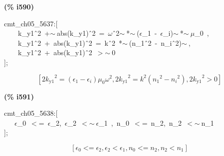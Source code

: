 \documentclass[fleqn]{article}
\begin{document}
\noindent
\begin{minipage}[t]{4.000000em}\color{red}\bfseries
(\% i590)	
\end{minipage}
\begin{minipage}[t]{\textwidth}\color{blue}
cmt\_ch05\_5637:[\\
\ \ \ \ k\_y1\^\ 2\ +\ensuremath{\sim\ }abs(k\_y1)\^\ 2\ =\ \ensuremath{\omega}\^\ 2\ensuremath{\sim\ }*\ensuremath{\sim\ }(\ensuremath{\epsilon}\_1\ -\ \ensuremath{\epsilon}\_i)\ensuremath{\sim\ }*\ensuremath{\sim\ }\ensuremath{\mu}\_0\ ,\ \\
\ \ \ \ k\_y1\^\ 2\ +\ abs(k\_y1)\^\ 2\ =\ k\^\ 2\ *\ensuremath{\sim\ }(n\_1\^\ 2\ -\ n\_i\^\ 2)\ensuremath{\sim\ },\\
\ \ \ \ k\_y1\^\ 2\ +\ abs(k\_y1)\^\ 2\ \ensuremath{>}\ensuremath{\sim\ }0\\
];
\end{minipage}
\[\displaystyle \tag{\% o590} 
\left[ 2 {{{k_{\ensuremath{\mathrm{y1}}}}}^{2}}=\left( {{\epsilon }_1}-{{\epsilon }_i}\right)  {{\mu }_0} {{\omega }^{2}}\operatorname{,}2 {{{k_{\ensuremath{\mathrm{y1}}}}}^{2}}={{k}^{2}} \left( {{{n_1}}^{2}}-{{{n_i}}^{2}}\right) \operatorname{,}2 {{{k_{\ensuremath{\mathrm{y1}}}}}^{2}}\operatorname{>  }0\right] \mbox{}
\]


\noindent
\begin{minipage}[t]{4.000000em}\color{red}\bfseries
(\% i591)	
\end{minipage}
\begin{minipage}[t]{\textwidth}\color{blue}
cmt\_ch05\_5638:[\\
\ \ \ \ensuremath{\epsilon}\_0\ \ensuremath{<}=\ \ensuremath{\epsilon}\_2,\ \ensuremath{\epsilon}\_2\ \ensuremath{<}\ensuremath{\sim\ }\ensuremath{\epsilon}\_1\ ,\ n\_0\ \ensuremath{<}=\ n\_2,\ n\_2\ \ensuremath{<}\ensuremath{\sim\ }n\_1\\
];
\end{minipage}
\[\displaystyle \tag{\% o591} 
\left[ {{\epsilon }_0}\operatorname{<  =}{{\epsilon }_2}\operatorname{,}{{\epsilon }_2}\operatorname{<  }{{\epsilon }_1}\operatorname{,}{n_0}\operatorname{<  =}{n_2}\operatorname{,}{n_2}\operatorname{<  }{n_1}\right] \mbox{}
\]
\end{document}
